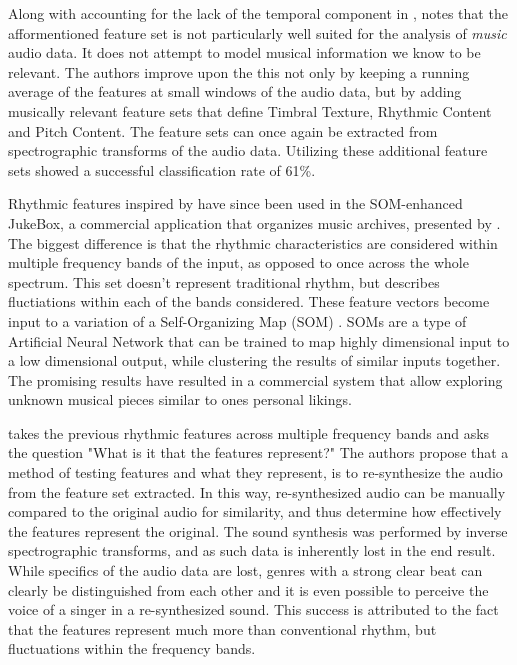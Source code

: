\documentclass[twoside]{article}
\begin{document}
\begin{multicols}{2}
Along with accounting for the lack of the temporal component in \citet{Wold96}, \citet{Tzanetakis02} notes that the afformentioned feature set is not particularly well suited for the analysis of \textit{music} audio data. It does not attempt to model musical information we know to be relevant. The authors improve upon the this not only by keeping a running average of the features at small windows of the audio data, but by adding musically relevant feature sets that define Timbral Texture, Rhythmic Content and Pitch Content. The feature sets can once again be extracted from spectrographic transforms of the audio data. Utilizing these additional feature sets showed a successful classification rate of 61\%.

Rhythmic features inspired by \citet{Tzanetakis02} have since been used in the SOM-enhanced JukeBox, a commercial application that organizes music archives, presented by \citet{rauber2003som}. The biggest difference is that the rhythmic characteristics are considered within multiple frequency bands of the input, as opposed to once across the whole spectrum. This set doesn't represent traditional rhythm, but describes fluctiations within each of the bands considered. These feature vectors become input to a variation of a Self-Organizing Map (SOM) \citep{kohonen2002make}. SOMs are a type of Artificial Neural Network that can be trained to map highly dimensional input to a low dimensional output, while clustering the results of similar inputs together. The promising results have resulted in a commercial system that allow exploring unknown musical pieces similar to ones personal likings.

\citet{Lidy05} takes the previous rhythmic features across multiple frequency bands and asks the question "What is it that the features represent?" The authors propose that a method of testing features and what they represent, is to re-synthesize the audio from the feature set extracted. In this way, re-synthesized audio can be manually compared to the original audio for similarity, and thus determine how effectively the features represent the original. The sound synthesis was performed by inverse spectrographic transforms, and as such data is inherently lost in the end result. While specifics of the audio data are lost, genres with a strong clear beat can clearly be distinguished from each other and it is even possible to perceive the voice of a singer in a re-synthesized sound. This success is attributed to the fact that the features represent much more than conventional rhythm, but fluctuations within the frequency bands.


\end{multicols}
\end{document}
